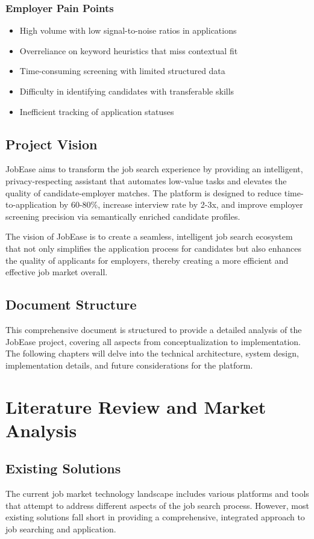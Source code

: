 \documentclass[12pt,a4paper]{report}
\begin{document}
\subsection{Employer Pain Points}
\begin{itemize}[leftmargin=2em]
  \item High volume with low signal-to-noise ratios in applications
  \item Overreliance on keyword heuristics that miss contextual fit
  \item Time-consuming screening with limited structured data
  \item Difficulty in identifying candidates with transferable skills
  \item Inefficient tracking of application statuses
\end{itemize}

\section{Project Vision}
JobEase aims to transform the job search experience by providing an intelligent, privacy-respecting assistant that automates low-value tasks and elevates the quality of candidate-employer matches. The platform is designed to reduce time-to-application by 60-80\%, increase interview rate by 2-3x, and improve employer screening precision via semantically enriched candidate profiles.

The vision of JobEase is to create a seamless, intelligent job search ecosystem that not only simplifies the application process for candidates but also enhances the quality of applicants for employers, thereby creating a more efficient and effective job market overall.

\section{Document Structure}
This comprehensive document is structured to provide a detailed analysis of the JobEase project, covering all aspects from conceptualization to implementation. The following chapters will delve into the technical architecture, system design, implementation details, and future considerations for the platform.

\chapter{Literature Review and Market Analysis}

\section{Existing Solutions}
The current job market technology landscape includes various platforms and tools that attempt to address different aspects of the job search process. However, most existing solutions fall short in providing a comprehensive, integrated approach to job searching and application.
\end{document}
